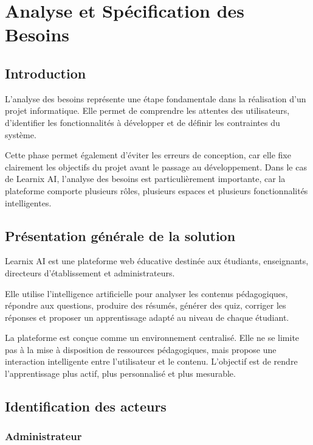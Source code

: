 \documentclass[12pt,a4paper]{report}
\begin{document}

\chapter{Analyse et Spécification des Besoins}

\section{Introduction}

L'analyse des besoins représente une étape fondamentale dans la réalisation d'un projet informatique. Elle permet de comprendre les attentes des utilisateurs, d'identifier les fonctionnalités à développer et de définir les contraintes du système.

Cette phase permet également d'éviter les erreurs de conception, car elle fixe
clairement les objectifs du projet avant le passage au développement. Dans le
cas de Learnix AI, l'analyse des besoins est particulièrement importante, car la
plateforme comporte plusieurs rôles, plusieurs espaces et plusieurs
fonctionnalités intelligentes.

\section{Présentation générale de la solution}

Learnix AI est une plateforme web éducative destinée aux étudiants, enseignants, directeurs d'établissement et administrateurs.

Elle utilise l'intelligence artificielle pour analyser les contenus pédagogiques, répondre aux questions, produire des résumés, générer des quiz, corriger les réponses et proposer un apprentissage adapté au niveau de chaque étudiant.

La plateforme est conçue comme un environnement centralisé. Elle ne se limite
pas à la mise à disposition de ressources pédagogiques, mais propose une
interaction intelligente entre l'utilisateur et le contenu. L'objectif est de
rendre l'apprentissage plus actif, plus personnalisé et plus mesurable.

\section{Identification des acteurs}

\subsection{Administrateur}
\end{document}
